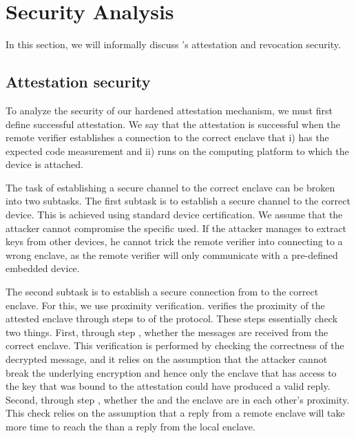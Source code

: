 \section{Security Analysis}
\label{sec:security_proximitee}

In this section, we will informally discuss \name{}'s attestation and revocation security. 
\subsection{Attestation security}

To analyze the security of our hardened attestation mechanism, we must first define successful attestation. We say that the attestation is successful when the remote verifier establishes a connection to the correct enclave that i) has the expected code measurement and ii) runs on the computing platform to which the \device device is attached.


The task of establishing a secure channel to the correct enclave can be broken into two subtasks. The first subtask is to establish a secure channel to the correct \device device. This is achieved using standard device certification. We assume that the attacker cannot compromise the specific \device used. If the attacker manages to extract keys from other \device devices, he cannot trick the remote verifier into connecting to a wrong enclave, as the remote verifier will only communicate with a pre-defined embedded device.




The second subtask is to establish a secure connection from \device to the correct enclave. For this, we use proximity verification. \device verifies the proximity of the attested enclave through steps \five to \eight of the protocol. These steps essentially check two things. First, through step \seven, whether the messages are received from the correct enclave. This verification is performed by checking the correctness of the decrypted message, and it relies on the assumption that the attacker cannot break the underlying encryption and hence only the enclave that has access to the key that was bound to the attestation could have produced a valid reply. Second, through step \eight, whether the \device and the enclave are in each other's proximity. This check relies on the assumption that a reply from a remote enclave will take more time to reach the \device than a reply from the local enclave.

